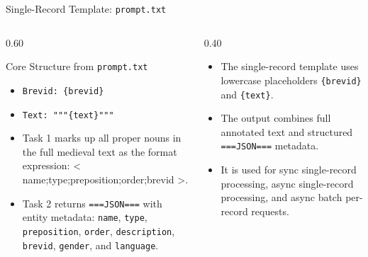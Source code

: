 \documentclass[
        11pt,
        compress,
        xcolor={dvipsnames}
    ]{beamer}
\begin{document}
\begin{frame}{Single-Record Template: \texttt{prompt.txt}}
  \begin{columns}[T]
    \begin{column}{0.60\textwidth}
      \begin{block}{Core Structure from \texttt{prompt.txt}}
        \footnotesize
        \begin{itemize}\setlength{\itemsep}{0.2em}
          \item \texttt{Brevid: \{brevid\}}
          \item \texttt{Text: """\{text\}"""}
          \item Task 1 marks up all proper nouns in the full medieval text as the format expression:\newline
          < name;type;preposition;order;brevid >.
          \item Task 2 returns \texttt{===JSON===} with entity metadata:
            \texttt{name}, \texttt{type}, \texttt{preposition}, \texttt{order},
            \texttt{description}, \texttt{brevid}, \texttt{gender}, and \texttt{language}.
        \end{itemize}
      \end{block}
    \end{column}
    \begin{column}{0.40\textwidth}
      \small
      \begin{itemize}
        \item The single-record template uses lowercase placeholders \texttt{\{brevid\}} and \texttt{\{text\}}.
        \item The output combines full annotated text and structured \texttt{===JSON===} metadata.
        \item It is used for sync single-record processing, async single-record processing, and async batch per-record requests.
      \end{itemize}
    \end{column}
  \end{columns}
\end{frame}
\end{document}
